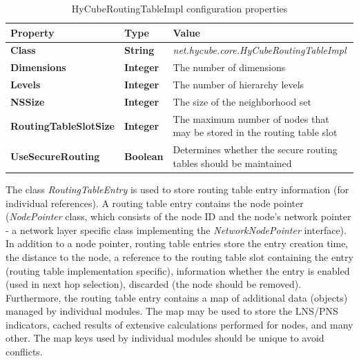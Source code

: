 \begin{table}
\scriptsize
\begin{center}
\begin{tabular}{p{3cm} p{3cm} p{8.5cm}}
	\hline
	\textbf{Property}				& \textbf{Type}				& \textbf{Value}					\\[1mm]
    \hline
	\textbf{Class}					& \textbf{String}			& \textit{net.hycube.core.HyCubeRoutingTableImpl}			\\[1.5mm]
    \textbf{Dimensions}				& \textbf{Integer}			& The number of dimensions													\\[1.5mm]
	\textbf{Levels}					& \textbf{Integer}			& The number of hierarchy levels											\\[1.5mm]
	\textbf{NSSize}					& \textbf{Integer}			& The size of the neighborhood set											\\[1.5mm]
	\textbf{RoutingTableSlotSize}	& \textbf{Integer}			& The maximum number of nodes that may be stored in the routing table slot	\\[1.5mm]
	\textbf{UseSecureRouting}		& \textbf{Boolean}			& Determines whether the secure routing tables should be maintained			\\[1.5mm]
    \hline
\end{tabular}
\end{center}
\caption{HyCubeRoutingTableImpl configuration properties}
\label{tab:libPropHyCubeRoutingTableImpl}
\end{table}


The class \emph{RoutingTableEntry} is used to store routing table entry information (for individual references). A routing table entry contains the node pointer (\emph{NodePointer} class, which consists of the node ID and the node's network pointer - a network layer specific class implementing the \emph{NetworkNodePointer} interface). In addition to a node pointer, routing table entries store the entry creation time, the distance to the node, a reference to the routing table slot containing the entry (routing table implementation specific), information whether the entry is enabled (used in next hop selection), discarded (the node should be removed). Furthermore, the routing table entry contains a map of additional data (objects) managed by individual modules. The map may be used to store the LNS/PNS indicators, cached results of extensive calculations performed for nodes, and many other. The map keys used by individual modules should be unique to avoid conflicts.




